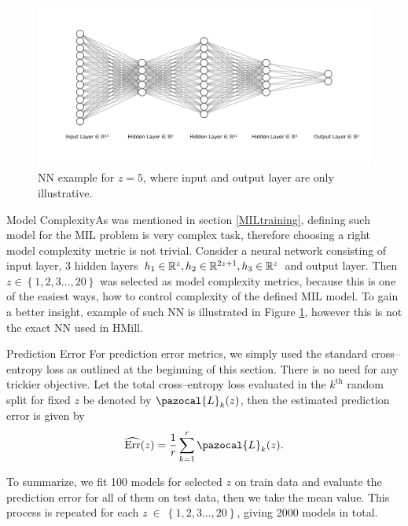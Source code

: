 \begin{figure}[h]
	\centering
	\includegraphics[width=16.0cm, trim={4cm 4.0cm 0.5cm 3.5cm},clip]{plots/Images/nn.pdf}
	\caption{NN example for $z=5$, where input and output layer are only illustrative.}
	\label{NN}
\end{figure}

\begin{para}{Model Complexity}As was mentioned in section \ref{MILtraining}, defining such model for the MIL problem is very complex task, therefore choosing a right model complexity metric is not trivial. Consider a neural network consisting of input layer, 3 hidden layers $h_1\in \mathbb{R}^z, h_2\in \mathbb{R}^{2z+1}, h_3\in \mathbb{R}^z$ and output layer. Then $z \in \left\{1,2,3\dots,20 \right\}$ was selected as model complexity metrics, because this is one of the easiest ways, how to control complexity of the defined MIL model. To gain a better insight, example of such NN is illustrated in Figure \ref{NN}, however this is not the exact NN used in HMill.
\end{para}     

\begin{para}{Prediction Error}
For prediction error metrics, we simply used the standard cross--entropy loss as outlined at the beginning of this section.  There is no need for any trickier objective. Let the total cross--entropy loss evaluated in the $k^{\mathrm{th}}$ random split for fixed $z$ be denoted by $\pazocal{L}_k(z)$, then the estimated prediction error is given by 
\begin{equation}
	\widehat{\mathrm{Err}}(z) = \frac{1}{r}\sum_{k=1}^r \pazocal{L}_k(z).
\end{equation}
\end{para}
\vspace{1cm}

To summarize,  we fit 100 models for selected $z$ on train data and evaluate the prediction error for all of them on test data, then we take the mean value. This process is repeated for each $z~\in~\left\{1,2,3\dots,20 \right\}$, giving 2000 models in total. 
